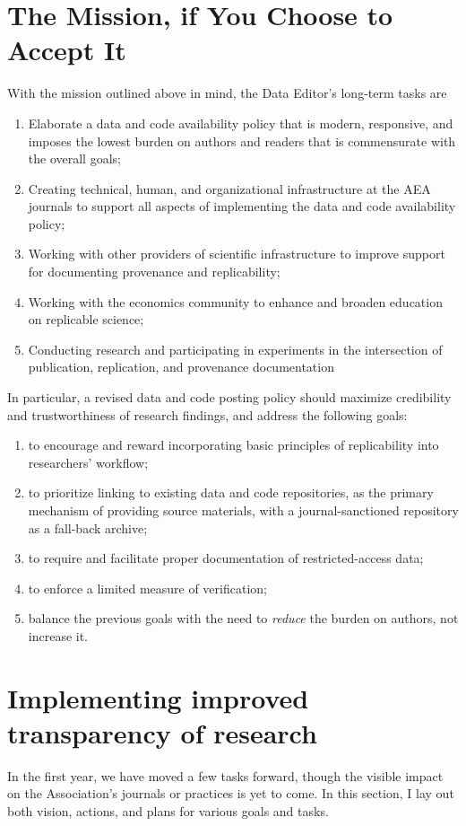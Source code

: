 \documentclass[PP]{AEA}
\begin{document}
\section{The Mission, if You Choose to Accept It}
With the mission outlined above in mind, the Data Editor's long-term tasks are
\begin{enumerate}
	\item Elaborate a data and code availability policy that is modern, responsive, and imposes the lowest burden on authors and readers that is commensurate with the overall goals;
	\item Creating technical, human, and organizational infrastructure at the AEA journals to support all aspects of implementing the data and code availability policy;
	\item Working with other providers of scientific infrastructure to improve support for documenting provenance and replicability;
	\item Working with the economics community to enhance and broaden education on replicable science;
	\item Conducting research and participating in experiments in the intersection of publication, replication, and provenance documentation
\end{enumerate}
In particular, a revised data and code posting policy should maximize credibility and trustworthiness of research findings, and address the following goals: 
\begin{enumerate}
	\item to encourage and reward incorporating basic principles of replicability into researchers' workflow;
	\item to prioritize linking to existing data and code repositories, as the primary mechanism of providing source materials, with a journal-sanctioned repository as a fall-back archive;
	\item to require and facilitate proper documentation of  restricted-access data;
	\item to enforce a limited measure of verification;
	\item balance the previous goals with the need to \textit{reduce} the burden on authors, not increase it. 
\end{enumerate}

\section{Implementing improved transparency of research}
In the first year, we have moved a few tasks forward, though the visible impact on the Association's journals or practices is yet to come. In this section, I lay out both vision, actions, and plans for various goals and tasks. 
\end{document}
